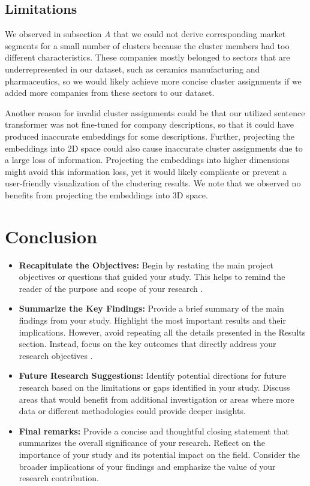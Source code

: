 \documentclass[conference]{IEEEtran}
\begin{document}
\subsection{Limitations}
We observed in subsection \textit{A} that we could not derive corresponding market segments for a small number of clusters because the cluster members had too different characteristics. These companies mostly belonged to sectors that are underrepresented in our dataset, such as ceramics manufacturing and pharmaceutics, so we would likely achieve more concise cluster assignments if we added more companies from these sectors to our dataset.

Another reason for invalid cluster assignments could be that our utilized sentence transformer was not fine-tuned for company descriptions, so that it could have produced inaccurate embeddings for some descriptions. Further, projecting the embeddings into 2D space could also cause inaccurate cluster assignments due to a large loss of information. Projecting the embeddings into higher dimensions might avoid this information loss, yet it would likely complicate or prevent a user-friendly visualization of the clustering results. We note that we observed no benefits from projecting the embeddings into 3D space.


\section{Conclusion}
\begin{itemize}
	\item \textbf{Recapitulate the Objectives:} Begin by restating the main project objectives or questions that guided your study. This helps to remind the reader of the purpose and scope of your research \cite{sample-article}.
	\item \textbf{Summarize the Key Findings:} Provide a brief summary of the main findings from your study. Highlight the most important results and their implications. However, avoid repeating all the details presented in the Results section. Instead, focus on the key outcomes that directly address your research objectives \cite{sample-web}.
	\item \textbf{Future Research Suggestions:} Identify potential directions for future research based on the limitations or gaps identified in your study. Discuss areas that would benefit from additional investigation or areas where more data or different methodologies could provide deeper insights.
	\item \textbf{Final remarks:} Provide a concise and thoughtful closing statement that summarizes the overall significance of your research. Reflect on the importance of your study and its potential impact on the field. Consider the broader implications of your findings and emphasize the value of your research contribution.
\end{itemize}
\end{document}
